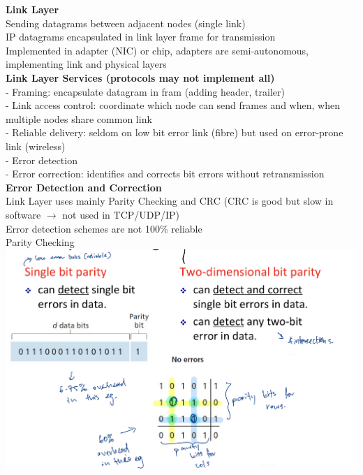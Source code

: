 \documentclass[10pt, a4paper]{article}
\newcommand{\blue}[1]{{\color{MidnightBlue}#1}}
\begin{document}
\begin{multicols*}{3}
		{\normalsize\textbf{Link Layer}}\\
		Sending datagrams between adjacent nodes (single link)\\
		IP datagrams encapsulated in link layer frame for transmission\\
		Implemented in adapter (NIC) or chip, adapters are semi-autonomous, implementing link and physical layers\\

		\textbf{Link Layer Services (protocols may not implement all)}\\
		- \blue{Framing}: encapsulate datagram in fram (adding header, trailer)\\
		- \blue{Link access control}: coordinate which node can send frames and when, when multiple nodes share common link\\
		- \blue{Reliable delivery}: seldom on low bit error link (fibre) but used on error-prone link (wireless)\\
		- \blue{Error detection}\\
		- \blue{Error correction}: identifies and corrects bit errors without retransmission\\

		\textbf{Error Detection and Correction}\\
		Link Layer uses mainly \blue{Parity Checking} and \blue{CRC} (CRC is good but slow in software $\rightarrow$ not used in TCP/UDP/IP)\\
		Error detection schemes are not 100\% reliable\\

		Parity Checking\\
		\includegraphics[scale=.15]{./assets/parityChecking}


\end{multicols*}
\end{document}
